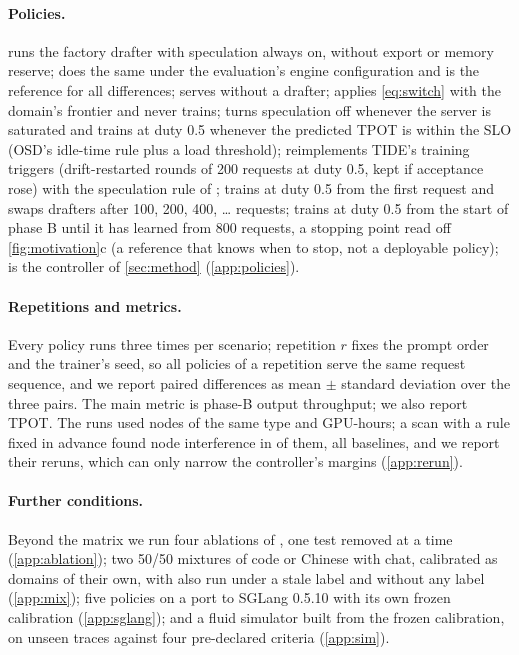 \paragraph{Policies.}  runs the factory drafter with speculation always on, without export or memory reserve;  does the same under the evaluation's engine configuration and is the reference for all differences;  serves without a drafter;  applies \cref{eq:switch} with the domain's frontier and never trains;  turns speculation off whenever the server is saturated and trains at duty 0.5 whenever the predicted TPOT is within the SLO (OSD's idle-time rule \citep{liu2024osd} plus a load threshold);  reimplements TIDE's training triggers \citep{park2026tide} (drift-restarted rounds of 200 requests at duty 0.5, kept if acceptance rose) with the speculation rule of ;  trains at duty 0.5 from the first request and swaps drafters after 100, 200, 400, \dots{} requests;  trains at duty 0.5 from the start of phase B until it has learned from 800 requests, a stopping point read off \cref{fig:motivation}c (a reference that knows when to stop, not a deployable policy);  is the controller of \cref{sec:method} (\cref{app:policies}).

\paragraph{Repetitions and metrics.} Every policy runs three times per scenario; repetition $r$ fixes the prompt order and the trainer's seed, so all policies of a repetition serve the same request sequence, and we report paired differences as mean $\pm$ standard deviation over the three pairs. The main metric is phase-B output throughput; we also report TPOT. The  runs used  nodes of the same type and  GPU-hours; a scan with a rule fixed in advance found node interference in  of them, all baselines, and we report their reruns, which can only narrow the controller's margins (\cref{app:rerun}).

\paragraph{Further conditions.} Beyond the matrix we run four ablations of , one test removed at a time (\cref{app:ablation}); two 50/50 mixtures of code or Chinese with chat, calibrated as domains of their own, with  also run under a stale label and without any label (\cref{app:mix}); five policies on a port to SGLang 0.5.10 with its own frozen calibration (\cref{app:sglang}); and a fluid simulator built from the frozen calibration, on unseen traces against four pre-declared criteria (\cref{app:sim}).
